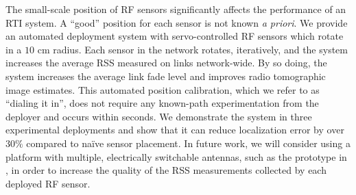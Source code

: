 \documentclass[conference]{IEEEtran}
\begin{document}
The small-scale position of RF sensors significantly affects the performance of an RTI system.  A ``good'' position for each sensor is not known \emph{a priori}.  We provide an automated deployment system with servo-controlled RF sensors which rotate in a $10$ cm radius.  Each sensor in the network rotates, iteratively, and the system increases the average RSS measured on links network-wide.  By so doing, the system increases the average link fade level and improves radio tomographic image estimates.  This automated position calibration, which we refer to as ``dialing it in'', does not require any known-path experimentation from the deployer and occurs within seconds.  We demonstrate the system in three experimental deployments and show that it can reduce localization error by over $30\%$ compared to na\"ive sensor placement. In future work, we will consider using a platform with multiple, electrically switchable antennas, such as the prototype in \cite{SPIDA_antenna}, in order to increase the quality of the RSS measurements collected by each deployed RF sensor. 
\end{document}
